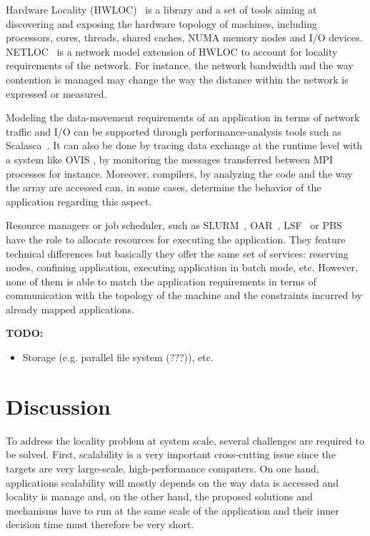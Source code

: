 Hardware Locality (HWLOC)~\cite{hwloc} is a library and a set of tools aiming at
discovering and exposing the hardware topology of machines, including
processors, cores, threads, shared caches, NUMA memory nodes and I/O devices.
NETLOC~\cite{netloc} is a network model extension of HWLOC to account for locality
requirements of the network. For instance, the network bandwidth and the way
contention is managed may change the way the distance within the network is
expressed or measured. 

Modeling the data-movement requirements of an application in terms of
network traffic and I/O can be supported through performance-analysis
tools such as Scalasca~\cite{geimer_ea:2010:scalascaarchitecture}. It
can also be done by tracing data exchange at the runtime level with a
system like OVIS \cite{ovis,SystemMonitoring}, by monitoring the
messages transferred between MPI processes for instance. Moreover,
compilers, by analyzing the code and the way the array are accessed can,
in some cases, determine the behavior of the application regarding this
aspect. 

Resource managers or job scheduler, such as SLURM~\cite{yoo2003slurm},
OAR~\cite{capit2005batch,}, LSF~\cite{zhou1992lsf}
or PBS~\cite{henderson1995job} have the role to allocate resources for executing the
application. They feature technical differences but basically they offer the
same set of services: reserving nodes, confining application, executing
application in batch mode, etc. However, none of them is able to match the
application requirements in terms of communication with the topology of the
machine and the constraints incurred by already mapped applications. 


{\bf TODO:}  
\begin{itemize}
\item Storage (e.g. parallel file system (???)), etc. 
\end{itemize}

\section{Discussion}
To address the locality problem at system scale, several challenges are required
to be solved. 
%
First, scalability is a very important cross-cutting issue since the targets are
very large-scale, high-performance computers. On one hand, applications
scalability will mostly depends on the way data is accessed and locality is
manage and, on the other hand, the proposed solutions and mechanisms have to run
at the same scale of the application and their inner decision time must
therefore be very short.


